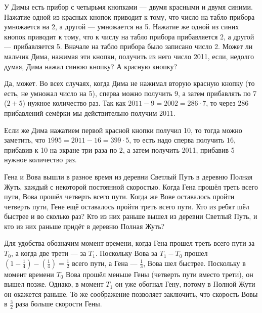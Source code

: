 
\begin{itemize}
\itC У Димы есть прибор с четырьмя кнопками --- двумя красными и двумя синими. Нажатие 
одной из красных кнопок приводит к тому, что число на табло прибора умножается на 2, 
а другой --- умножается на 5. Нажатие же одной из синих кнопок приводит к тому, что к числу 
на табло прибора прибавляется 2, а другой --- прибавляется 5. Вначале на табло прибора 
было записано число 2. Может ли мальчик Дима, нажимая эти кнопки, получить из него число 
2011, если, недолго думая, Дима нажал синюю кнопку? А красную кнопку?

\itr Да, может. Во всех случаях, когда Дима не нажимал вторую красную кнопку (то есть, не
умножал число на 5), сперва можно получить $9$, а затем прибавлять по 7 ($2+5$) нужное
количество раз. Так как $2011-9 = 2002 = 286 \cdot 7$, то через 286 прибавлений семёрки
мы действительно получим 2011.

Если же Дима нажатием первой красной кнопки получил 10, то тогда можно заметить, что 
$1995 = 2011-16 = 399 \cdot 5$, то есть надо сперва получить $16$, прибавив к 10 на экране
три раза по $2$, а затем получить 2011, прибавив 5 нужное количество раз.
\end{itemize}

\begin{itemize}
\itC Гена и Вова вышли в разное время из деревни Светлый Путь в деревню Полная Жуть, каждый с некоторой 
постоянной скоростью. Когда Гена прошёл треть всего пути, Вова прошёл четверть всего 
пути. Когда же Вове оставалось пройти четверть пути, Гене ещё оставалось пройти треть 
всего пути. Кто из ребят шёл быстрее и во сколько раз? Кто из них раньше вышел из деревни
Светлый Путь, и кто из них раньше придёт в деревню Полная Жуть?

\itr Для удобства обозначим момент времени, когда Гена прошел треть всего пути за $T_0$, 
а когда две трети --- за $T_1$. Поскольку Вова за $T_1-T_0$ прошел 
$(1-\frac{1}{4})-(\frac{1}{4}) = \frac{1}{2}$ всего пути, 
а Гена --- $\frac{1}{3}$, Вова шел быстрее. Поскольку в момент времени $T_0$ 
Вова прошёл меньше Гены (четверть пути вместо трети), он вышел позже. Однако, 
в момент $T_1$ он уже обогнал Гену, потому в Полной Жути он окажется раньше.
То же соображение позволяет заключить, что скорость Вовы в $\frac{3}{2}$ раза больше
скорости Гены.
\end{itemize}

